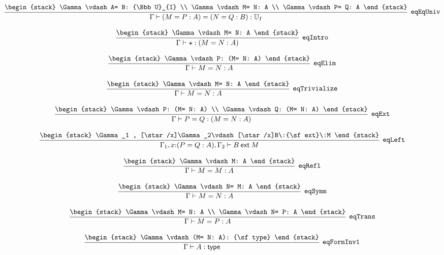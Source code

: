 \[
\infer[{\tt eqEqUniv}]{\Gamma \vdash (M= P: A)= (N= Q: B): {\Bbb U}_{I}}{
\begin{stack}
\Gamma \vdash A= B: {\Bbb U}_{I}
\\
\Gamma \vdash M= N: A
\\
\Gamma \vdash P= Q: A
\end{stack}}
\]

\[
\infer[{\tt eqIntro}]{\Gamma \vdash \star : (M= N: A)}{
\begin{stack}
\Gamma \vdash M= N: A
\end{stack}}
\]

\[
\infer[{\tt eqElim}]{\Gamma \vdash M= N: A}{
\begin{stack}
\Gamma \vdash P: (M= N: A)
\end{stack}}
\]

\[
\infer[{\tt eqTrivialize}]{\Gamma \vdash M= N: A}{
\begin{stack}
\Gamma \vdash M= N: A
\end{stack}}
\]

\[
\infer[{\tt eqExt}]{\Gamma \vdash P= Q: (M= N: A)}{
\begin{stack}
\Gamma \vdash P: (M= N: A)
\\
\Gamma \vdash Q: (M= N: A)
\end{stack}}
\]

\[
\infer[{\tt eqLeft}]{\Gamma_1 ,x\mathord{:}(P= Q: A), \Gamma_2 \vdash B\:{\sf ext}\:M}{
\begin{stack}
\Gamma_1 , [\star /x]\Gamma_2\vdash [\star /x]B\:{\sf ext}\:M
\end{stack}}
\]

\[
\infer[{\tt eqRefl}]{\Gamma \vdash M= M: A}{
\begin{stack}
\Gamma \vdash M: A
\end{stack}}
\]

\[
\infer[{\tt eqSymm}]{\Gamma \vdash M= N: A}{
\begin{stack}
\Gamma \vdash N= M: A
\end{stack}}
\]

\[
\infer[{\tt eqTrans}]{\Gamma \vdash M= P: A}{
\begin{stack}
\Gamma \vdash M= N: A
\\
\Gamma \vdash N= P: A
\end{stack}}
\]

\[
\infer[{\tt eqFormInv1}]{\Gamma \vdash A: {\sf type}}{
\begin{stack}
\Gamma \vdash (M= N: A): {\sf type}
\end{stack}}
\]


